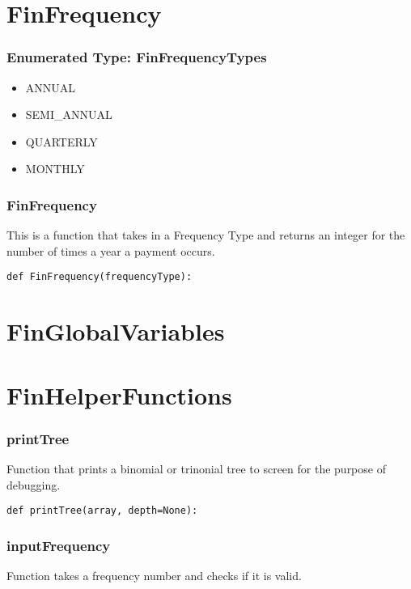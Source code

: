 \documentclass[twoside,11pt]{book}
\begin{document}
\newpage
\section{FinFrequency}

\subsubsection{Enumerated Type: FinFrequencyTypes}
\begin{itemize}
\item{ANNUAL}
\item{SEMI\_ANNUAL}
\item{QUARTERLY}
\item{MONTHLY}
\end{itemize}

\subsubsection*{{\bf FinFrequency}}
This is a function that takes in a Frequency Type and returns an integer for the number of times a year a payment occurs. 

\begin{lstlisting}
def FinFrequency(frequencyType):
\end{lstlisting}

\newpage
\section{FinGlobalVariables}

\newpage
\section{FinHelperFunctions}

\subsubsection*{{\bf printTree}}
Function that prints a binomial or trinonial tree to screen for the purpose of debugging.  

\begin{lstlisting}
def printTree(array, depth=None):
\end{lstlisting}

\subsubsection*{{\bf inputFrequency}}
Function takes a frequency number and checks if it is valid.  
\end{document}
